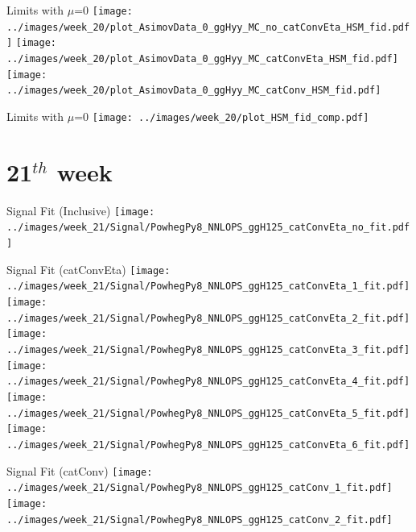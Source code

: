 \documentclass[10pt,UKenglish, leqno, xcolor = dvipsnames]{beamer}
\begin{document}
		\begin{frame}{Limits with $\mu$=0}
			\vfill
			\centering
			\texttt{[image: ../images/week\_20/plot\_AsimovData\_0\_ggHyy\_MC\_no\_catConvEta\_HSM\_fid.pdf]}
			\texttt{[image: ../images/week\_20/plot\_AsimovData\_0\_ggHyy\_MC\_catConvEta\_HSM\_fid.pdf]}
			\texttt{[image: ../images/week\_20/plot\_AsimovData\_0\_ggHyy\_MC\_catConv\_HSM\_fid.pdf]}
			\vfill
		\end{frame}
	
		\begin{frame}{Limits with $\mu$=0}
			\vfill
			\centering
			\texttt{[image: ../images/week\_20/plot\_HSM\_fid\_comp.pdf]}
			\vfill
		\end{frame}
	
	\section{21$^{th}$ week}
	\SectionPage
	
		\begin{frame}{Signal Fit (Inclusive)}
			\vfill
			\centering
			\texttt{[image: ../images/week\_21/Signal/PowhegPy8\_NNLOPS\_ggH125\_catConvEta\_no\_fit.pdf]}
			\vfill
		\end{frame}
	
		\begin{frame}{Signal Fit (catConvEta)}
			\vfill
			\centering
			\texttt{[image: ../images/week\_21/Signal/PowhegPy8\_NNLOPS\_ggH125\_catConvEta\_1\_fit.pdf]}
			\texttt{[image: ../images/week\_21/Signal/PowhegPy8\_NNLOPS\_ggH125\_catConvEta\_2\_fit.pdf]}
			\texttt{[image: ../images/week\_21/Signal/PowhegPy8\_NNLOPS\_ggH125\_catConvEta\_3\_fit.pdf]}
			\texttt{[image: ../images/week\_21/Signal/PowhegPy8\_NNLOPS\_ggH125\_catConvEta\_4\_fit.pdf]}
			\texttt{[image: ../images/week\_21/Signal/PowhegPy8\_NNLOPS\_ggH125\_catConvEta\_5\_fit.pdf]}
			\texttt{[image: ../images/week\_21/Signal/PowhegPy8\_NNLOPS\_ggH125\_catConvEta\_6\_fit.pdf]}
			\vfill
		\end{frame}
	
		\begin{frame}{Signal Fit (catConv)}
			\vfill
			\centering
			\texttt{[image: ../images/week\_21/Signal/PowhegPy8\_NNLOPS\_ggH125\_catConv\_1\_fit.pdf]}
			\texttt{[image: ../images/week\_21/Signal/PowhegPy8\_NNLOPS\_ggH125\_catConv\_2\_fit.pdf]}
			\vfill
		\end{frame}
	
\end{document}
